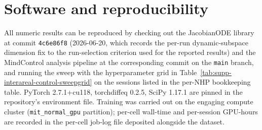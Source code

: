 \section{Software and reproducibility}\label{supp:interareal-control-repro}

All numeric results can be reproduced by checking out the JacobianODE library at commit \texttt{4c6e86f8} (2026-06-20, which records the per-run dynamic-subspace dimension fix to the run-selection criterion used for the reported results) and the MindControl analysis pipeline at the corresponding commit on the \texttt{main} branch, and running the sweep with the hyperparameter grid in Table~\ref{tab:supp-interareal-control-sweepgrid} on the sessions listed in the per-NHP bookkeeping table. PyTorch 2.7.1+cu118, torchdiffeq 0.2.5, SciPy 1.17.1 are pinned in the repository's environment file. Training was carried out on the engaging compute cluster (\texttt{mit\_normal\_gpu} partition); per-cell wall-time and per-session GPU-hours are recorded in the per-cell job-log file deposited alongside the dataset.

